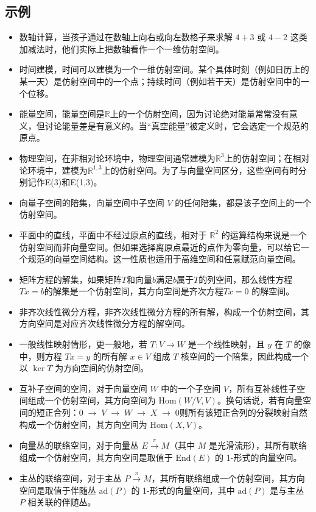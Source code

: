 \subsection{示例}
\begin{itemize}
\item 数轴计算，当孩子通过在数轴上向右或向左数格子来求解 $4 + 3$ 或 $4 - 2$ 这类加减法时，他们实际上把数轴看作一个一维仿射空间。
\item 时间建模，时间可以建模为一个一维仿射空间。某个具体时刻（例如日历上的某一天）是仿射空间中的一个点；持续时间（例如若干天）是仿射空间中的一个位移。
\item 能量空间，能量空间是$\mathbb{R}$上的一个仿射空间，因为讨论绝对能量常常没有意义，但讨论能量差是有意义的。当“真空能量”被定义时，它会选定一个规范的原点。
\item 物理空间，在非相对论环境中，物理空间通常建模为$\mathbb{R}^3$上的仿射空间；在相对论环境中，建模为$\mathbb{R}^{1,3}$上的仿射空间。为了与向量空间区分，这些空间有时分别记作E(3)和E(1,3)。
\item 向量子空间的陪集，向量空间中子空间 $V$ 的任何陪集，都是该子空间上的一个仿射空间。
\item 平面中的直线，平面中不经过原点的直线，相对于 $\mathbb{R}^2$ 的运算结构来说是一个仿射空间而非向量空间。但如果选择离原点最近的点作为零向量，可以给它一个规范的向量空间结构。这一性质也适用于高维空间和任意赋范向量空间。
\item 矩阵方程的解集，如果矩阵$T$和向量$b$满足$b$属于$T$的列空间，那么线性方程$Tx = b$的解集是一个仿射空间，其方向空间是齐次方程$Tx = 0$ 的解空间。
\item 非齐次线性微分方程，非齐次线性微分方程的所有解，构成一个仿射空间，其方向空间是对应齐次线性微分方程的解空间。
\item 一般线性映射情形，更一般地，若 $T: V \to W$ 是一个线性映射，且 $y$ 在 $T$ 的像中，则方程 $Tx = y$ 的所有解 $x \in V$ 组成 $T$ 核空间的一个陪集，因此构成一个以 $\ker T$ 为方向空间的仿射空间。
\item 互补子空间的空间，对于向量空间 $W$ 中的一个子空间 $V$，所有互补线性子空间组成一个仿射空间，其方向空间为 $\text{Hom}(W/V, V)$。换句话说，若有向量空间的短正合列：$0 \;\longrightarrow\; V \;\longrightarrow\; W \;\longrightarrow\; X \;\longrightarrow\; 0$则所有该短正合列的分裂映射自然构成一个仿射空间，其方向空间为 $\text{Hom}(X, V)$。
\item 向量丛的联络空间，对于向量丛 $E \xrightarrow{\pi} M$（其中 $M$ 是光滑流形），其所有联络组成一个仿射空间，其方向空间是取值于 $\text{End}(E)$ 的 1-形式的向量空间。
\item 主丛的联络空间，对于主丛 $P \xrightarrow{\pi} M$，其所有联络组成一个仿射空间，其方向空间是取值于伴随丛 $\text{ad}(P)$ 的 1-形式的向量空间，其中 $\text{ad}(P)$ 是与主丛 $P$ 相关联的伴随丛。
\end{itemize}

